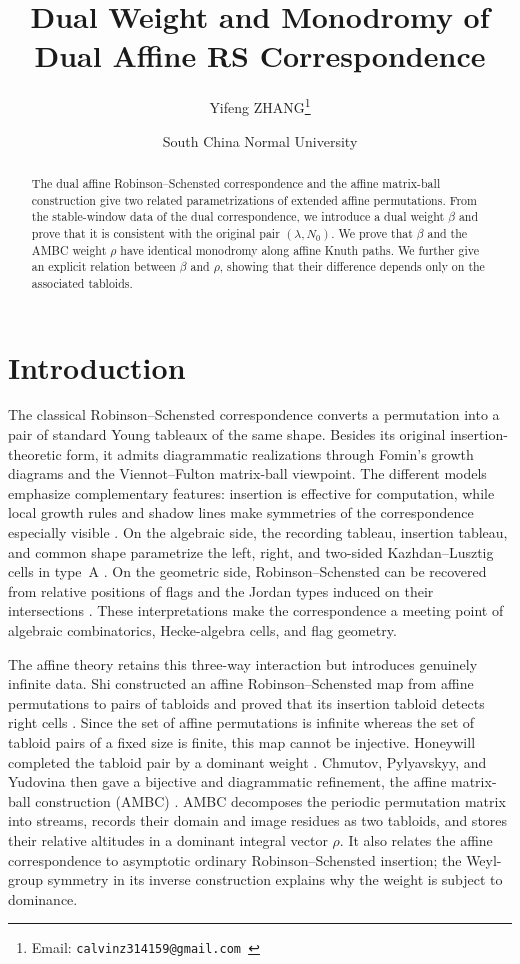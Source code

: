 \documentclass[11pt]{article}
\title{Dual Weight and Monodromy of Dual Affine RS Correspondence}
\author{
Yifeng ZHANG\thanks{
Email: \tt calvinz314159@gmail.com
}
}
\date{South China Normal University}
\theoremstyle{definition}
\theoremstyle{remark}
\begin{document}
\maketitle

\begin{abstract}
The dual affine Robinson--Schensted correspondence and the affine matrix-ball construction give two related parametrizations of extended affine permutations.
From the stable-window data of the dual correspondence, we introduce a dual weight \(\beta\) and prove that it is consistent with the original pair \((\lambda,N_0)\).
We prove that \(\beta\) and the AMBC weight \(\rho\) have identical monodromy along affine Knuth paths.
We further give an explicit relation between \(\beta\) and \(\rho\), showing that their difference depends only on the associated tabloids.
\end{abstract}

\section{Introduction}\label{sec:introduction}

The classical Robinson--Schensted correspondence converts a permutation into a pair of
standard Young tableaux of the same shape.  Besides its original insertion-theoretic
form, it admits diagrammatic realizations through Fomin's growth diagrams and the
Viennot--Fulton matrix-ball viewpoint.  The different models emphasize complementary
features: insertion is effective for computation, while local growth rules and shadow
lines make symmetries of the correspondence especially visible
\cite{Fom95,Vie77,Ful97}.  On
the algebraic side, the recording tableau, insertion tableau, and common shape
parametrize the left, right, and two-sided Kazhdan--Lusztig cells in type~A
\cite{KL79}.  On the geometric side, Robinson--Schensted can be recovered from relative
positions of flags and the Jordan types induced on their intersections
\cite{Ste88,BF01}.  These interpretations make the correspondence a meeting point of
algebraic combinatorics, Hecke-algebra cells, and flag geometry.

The affine theory retains this three-way interaction but introduces genuinely infinite
data.  Shi constructed an affine Robinson--Schensted map from affine permutations to
pairs of tabloids and proved that its insertion tabloid detects right cells
\cite{Shi91}.  Since the set of affine permutations is infinite whereas the set of
tabloid pairs of a fixed size is finite, this map cannot be injective.  Honeywill
completed the tabloid pair by a dominant weight \cite{Hon05}.  Chmutov, Pylyavskyy, and
Yudovina then gave a bijective and diagrammatic refinement, the affine matrix-ball
construction (AMBC) \cite{CPY18}.  AMBC decomposes the periodic permutation matrix into
streams, records their domain and image residues as two tabloids, and stores their
relative altitudes in a dominant integral vector \(\rho\).  It also relates the affine
correspondence to asymptotic ordinary Robinson--Schensted insertion; the Weyl-group
symmetry in its inverse construction explains why the weight is subject to dominance.
\end{document}
